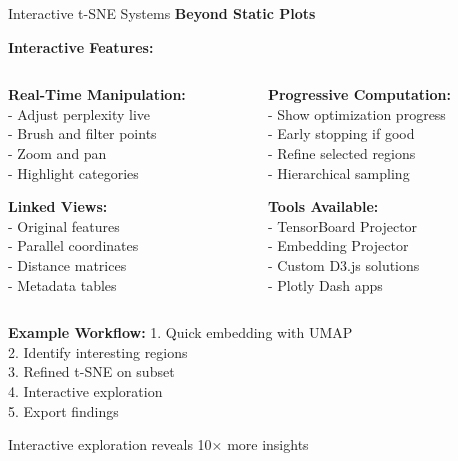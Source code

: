 \documentclass[10pt]{beamer}
\newcommand{\emphtext}[1]{\textcolor{upcblue}{\textbf{#1}}}
\newcommand{\conceptbox}[1]{\colorbox{upcblue!10}{\begin{minipage}{0.85\textwidth}\centering #1\end{minipage}}}
\begin{document}
\begin{frame}{Interactive t-SNE Systems}
\emphtext{Beyond Static Plots}

\vspace{0.3cm}
\textbf{Interactive Features:}

\begin{columns}[T]
\begin{column}{0.48\textwidth}
\footnotesize
\textbf{Real-Time Manipulation:}\\
- Adjust perplexity live\\
- Brush and filter points\\
- Zoom and pan\\
- Highlight categories

\vspace{0.2cm}
\textbf{Linked Views:}\\
- Original features\\
- Parallel coordinates\\
- Distance matrices\\
- Metadata tables
\end{column}

\begin{column}{0.48\textwidth}
\footnotesize
\textbf{Progressive Computation:}\\
- Show optimization progress\\
- Early stopping if good\\
- Refine selected regions\\
- Hierarchical sampling

\vspace{0.2cm}
\textbf{Tools Available:}\\
- TensorBoard Projector\\
- Embedding Projector\\
- Custom D3.js solutions\\
- Plotly Dash apps
\end{column}
\end{columns}

\vspace{0.3cm}
\textbf{Example Workflow:}
\footnotesize
1. Quick embedding with UMAP\\
2. Identify interesting regions\\
3. Refined t-SNE on subset\\
4. Interactive exploration\\
5. Export findings

\begin{center}
\conceptbox{\footnotesize Interactive exploration reveals 10× more insights}
\end{center}
\end{frame}
\end{document}
